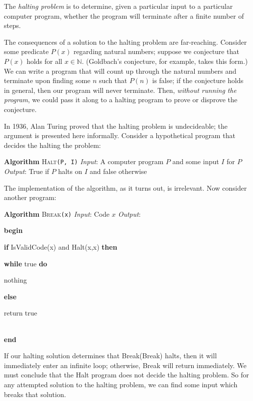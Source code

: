 \documentclass{article}
\newcommand{\Lindent}{0.4in}
\newenvironment{Lalgorithm}[4]{
\textbf{Algorithm} \textsc{#1}\texttt{(#2)}\newline
\textit{Input}: #3\newline
\textit{Output}: #4\newline

}{}
\newcommand{\Lgroup}[1]{\textbf{begin}\\\hspace*{\Lindent}\parbox{\textwidth}{#1}\\\textbf{end}}
\newcommand{\Lif}[2]{\textbf{if} #1 \textbf{then}\\\hspace*{\Lindent}\parbox{\textwidth}{#2}}
\newcommand{\Lelse}[1]{\textbf{else}\\\hspace*{\Lindent}\parbox{\textwidth}{#1}}
\newcommand{\Lwhile}[2]{\textbf{while} #1 \textbf{do}\\\hspace*{\Lindent}\parbox{\textwidth}{#2}}
\begin{document}

The \emph{halting problem} is to determine, given a particular input to a particular computer program, whether the program will terminate after a finite number of steps.

The consequences of a solution to the halting problem are far-reaching.  Consider some predicate $P(x)$ regarding natural numbers; suppose we conjecture that $P(x)$ holds for all $x \in \mathbb{N}$.  (Goldbach's conjecture, for example, takes this form.)  We can write a program that will count up through the natural numbers and terminate upon finding some $n$ such that $P(n)$ is false; if the conjecture holds in general, then our program will never terminate.  Then, \emph{without running the program}, we could pass it along to a halting program to prove or disprove the conjecture.

In 1936, Alan Turing proved that the halting problem is undecideable; the argument is presented here informally.  Consider a hypothetical program that decides the halting the problem:

\begin{Lalgorithm}{Halt}{P, I}{A computer program $P$ and some input $I$ for $P$}{True if $P$ halts on $I$ and false otherwise}
\end{Lalgorithm}

The implementation of the algorithm, as it turns out, is irrelevant.  Now consider another program:

\begin{Lalgorithm}{Break}{x}{Code $x$}{}
\Lgroup{
\Lif{IsValidCode(x) and {Halt(x,x)}}{\Lwhile{true}{nothing}}
\Lelse{ return true }
}

\end{Lalgorithm}

If our halting solution determines that Break(Break) halts, then it will immediately enter an infinite loop; otherwise, Break will return immediately.  We must conclude that the Halt program does not decide the halting problem.
So for any attempted solution to the halting problem, we can find some input which breaks that solution.
\end{document}
